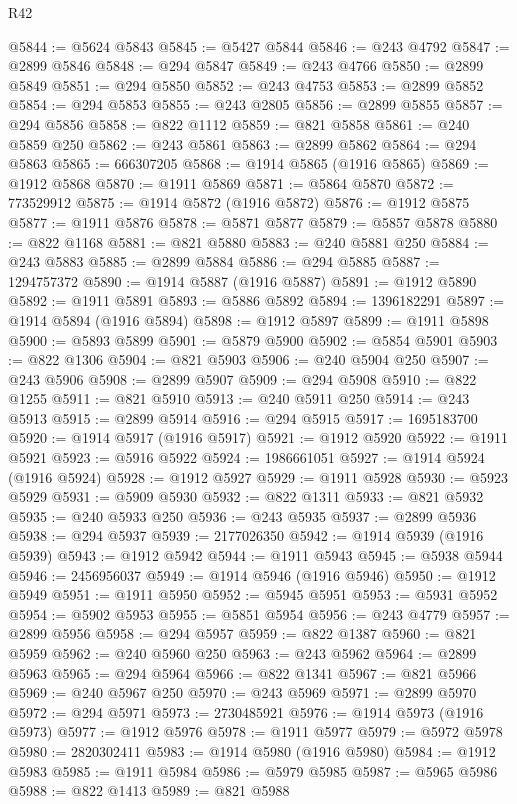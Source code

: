 \begin{lexlean}{R42}
\begin{coremodule}
{@5844 := @5624 @5843
@5845 := @5427 @5844
@5846 := @243 @4792
@5847 := @2899 @5846
@5848 := @294 @5847
@5849 := @243 @4766
@5850 := @2899 @5849
@5851 := @294 @5850
@5852 := @243 @4753
@5853 := @2899 @5852
@5854 := @294 @5853
@5855 := @243 @2805
@5856 := @2899 @5855
@5857 := @294 @5856
@5858 := @822 @1112
@5859 := @821 @5858
@5861 := @240 @5859 @250
@5862 := @243 @5861
@5863 := @2899 @5862
@5864 := @294 @5863
@5865 := 666307205
@5868 := @1914 @5865 (@1916 @5865)
@5869 := @1912 @5868
@5870 := @1911 @5869
@5871 := @5864 @5870
@5872 := 773529912
@5875 := @1914 @5872 (@1916 @5872)
@5876 := @1912 @5875
@5877 := @1911 @5876
@5878 := @5871 @5877
@5879 := @5857 @5878
@5880 := @822 @1168
@5881 := @821 @5880
@5883 := @240 @5881 @250
@5884 := @243 @5883
@5885 := @2899 @5884
@5886 := @294 @5885
@5887 := 1294757372
@5890 := @1914 @5887 (@1916 @5887)
@5891 := @1912 @5890
@5892 := @1911 @5891
@5893 := @5886 @5892
@5894 := 1396182291
@5897 := @1914 @5894 (@1916 @5894)
@5898 := @1912 @5897
@5899 := @1911 @5898
@5900 := @5893 @5899
@5901 := @5879 @5900
@5902 := @5854 @5901
@5903 := @822 @1306
@5904 := @821 @5903
@5906 := @240 @5904 @250
@5907 := @243 @5906
@5908 := @2899 @5907
@5909 := @294 @5908
@5910 := @822 @1255
@5911 := @821 @5910
@5913 := @240 @5911 @250
@5914 := @243 @5913
@5915 := @2899 @5914
@5916 := @294 @5915
@5917 := 1695183700
@5920 := @1914 @5917 (@1916 @5917)
@5921 := @1912 @5920
@5922 := @1911 @5921
@5923 := @5916 @5922
@5924 := 1986661051
@5927 := @1914 @5924 (@1916 @5924)
@5928 := @1912 @5927
@5929 := @1911 @5928
@5930 := @5923 @5929
@5931 := @5909 @5930
@5932 := @822 @1311
@5933 := @821 @5932
@5935 := @240 @5933 @250
@5936 := @243 @5935
@5937 := @2899 @5936
@5938 := @294 @5937
@5939 := 2177026350
@5942 := @1914 @5939 (@1916 @5939)
@5943 := @1912 @5942
@5944 := @1911 @5943
@5945 := @5938 @5944
@5946 := 2456956037
@5949 := @1914 @5946 (@1916 @5946)
@5950 := @1912 @5949
@5951 := @1911 @5950
@5952 := @5945 @5951
@5953 := @5931 @5952
@5954 := @5902 @5953
@5955 := @5851 @5954
@5956 := @243 @4779
@5957 := @2899 @5956
@5958 := @294 @5957
@5959 := @822 @1387
@5960 := @821 @5959
@5962 := @240 @5960 @250
@5963 := @243 @5962
@5964 := @2899 @5963
@5965 := @294 @5964
@5966 := @822 @1341
@5967 := @821 @5966
@5969 := @240 @5967 @250
@5970 := @243 @5969
@5971 := @2899 @5970
@5972 := @294 @5971
@5973 := 2730485921
@5976 := @1914 @5973 (@1916 @5973)
@5977 := @1912 @5976
@5978 := @1911 @5977
@5979 := @5972 @5978
@5980 := 2820302411
@5983 := @1914 @5980 (@1916 @5980)
@5984 := @1912 @5983
@5985 := @1911 @5984
@5986 := @5979 @5985
@5987 := @5965 @5986
@5988 := @822 @1413
@5989 := @821 @5988
}
\end{coremodule}
\end{lexlean}

